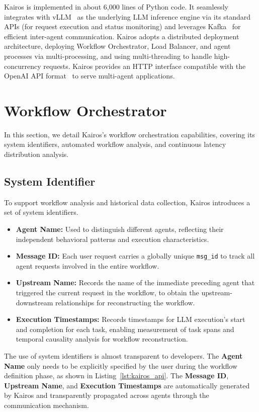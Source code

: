 \documentclass[sigplan,nonacm]{acmart}
\newcommand{\system}{Kairos}
\begin{document}
\system{} is implemented in about 6,000 lines of Python code. It seamlessly integrates with vLLM~\cite{kwon2023efficient} as the underlying LLM inference engine via its standard APIs (for request execution and status monitoring) and leverages Kafka~\cite{kafka} for efficient inter-agent communication. \system{} adopts a distributed deployment architecture, deploying Workflow Orchestrator, Load Balancer, and agent processes via multi-processing, and using multi-threading to handle high-concurrency requests. \system{} provides an HTTP interface compatible with the OpenAI API format~\cite{openai_api} to serve multi-agent applications.

\section{Workflow Orchestrator}
In this section, we detail \system{}'s workflow orchestration capabilities, covering its system identifiers, automated workflow analysis, and continuous latency distribution analysis.
\subsection{System Identifier}
\label{sec:System Identifier}
To support workflow analysis and historical data collection, \system{} introduces a set of system identifiers.

\begin{itemize}
    \item \textbf{Agent Name:} Used to distinguish different agents, reflecting their independent behavioral patterns and execution characteristics.
    \item \textbf{Message ID:} Each user request carries a globally unique \texttt{msg\_id} to track all agent requests involved in the entire workflow.
    \item \textbf{Upstream Name:} Records the name of the immediate preceding agent that triggered the current request in the workflow, to obtain the upstream-downstream relationships for reconstructing the workflow.
    \item \textbf{Execution Timestamps:} Records timestamps for LLM execution's start and completion for each task, enabling measurement of task spans and temporal causality analysis for workflow reconstruction.
\end{itemize}


The use of system identifiers is almost transparent to developers. The \textbf{Agent Name} only needs to be explicitly specified by the user during the workflow definition phase, as shown in Listing~\ref{lst:kairos_api}. The \textbf{Message ID}, \textbf{Upstream Name}, and \textbf{Execution Timestamps} are automatically generated by \system{} and transparently propagated across agents through the communication mechanism.
\end{document}
